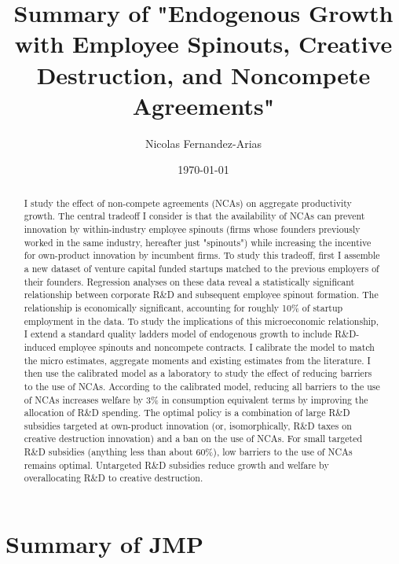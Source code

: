 \documentclass[11pt,english]{article}
\begin{document}
	
\title{Summary of "Endogenous Growth with Employee Spinouts, Creative Destruction, and Noncompete Agreements"}

\author{Nicolas Fernandez-Arias} 
\date{\today }


\maketitle

\begin{abstract}
	I study the effect of non-compete agreements (NCAs) on aggregate productivity growth. The central tradeoff I consider is that the availability of NCAs can prevent innovation by within-industry employee spinouts (firms whose founders previously worked in the same industry, hereafter just "spinouts") while increasing the incentive for own-product innovation by incumbent firms. To study this tradeoff, first I assemble a new dataset of venture capital funded startups matched to the previous employers of their founders. Regression analyses on these data reveal a statistically significant relationship between corporate R\&D and subsequent employee spinout formation. The relationship is economically significant, accounting for roughly 10\% of startup employment in the data. To study the implications of this microeconomic relationship, I extend a standard quality ladders model of endogenous growth to include R\&D-induced employee spinouts and noncompete contracts. I calibrate the model to match the micro estimates, aggregate moments and existing estimates from the literature. I then use the calibrated model as a laboratory to study the effect of reducing barriers to the use of NCAs. According to the calibrated model, reducing all barriers to the use of NCAs increases welfare by 3\% in consumption equivalent terms by improving the allocation of R\&D spending. The optimal policy is a combination of large R\&D subsidies targeted at own-product innovation (or, isomorphically, R\&D taxes on creative destruction innovation) and a ban on the use of NCAs. For small targeted R\&D subsidies (anything less than about 60\%), low barriers to the use of NCAs remains optimal. Untargeted R\&D subsidies reduce growth and welfare by overallocating R\&D to creative destruction. 
\end{abstract}


\section{Summary of JMP}
\end{document}
